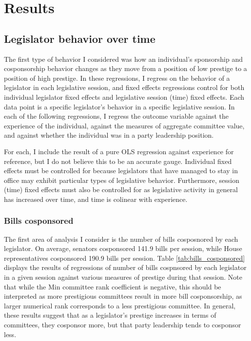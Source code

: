 \documentclass{article}
\begin{document}
\section{Results} 
\subsection{Legislator behavior over time}
The first type of behavior I considered was how an individual's sponsorship and cosponsorship behavior changes as they move from a position of low prestige to a position of high prestige. In these regressions, I regress on the behavior of a legislator in each legislative session, and fixed effects regressions control for both individual legislator fixed effects and legislative session (time) fixed effects. Each data point is a specific legislator's behavior in a specific legislative session. In each of the following regressions, I regress the outcome variable against the experience of the individual, against the measures of aggregate committee value, and against whether the individual was in a party leadership position. 

For each, I include the result of a pure OLS regression against experience for reference, but I do not believe this to be an accurate gauge. Individual fixed effects must be controlled for because legislators that have managed to stay in office may exhibit particular types of legislative behavior. Furthermore, session (time) fixed effects must also be controlled for as legislative activity in general has increased over time, and time is colinear with experience. 

\subsubsection{Bills cosponsored}
\label{result:bills_cosponsored}
The first area of analysis I consider is the number of bills cosposnored by each legislator. On average, senators cosponsored 141.9 bills per session, while House representatives cosponsored 190.9 bills per session. Table \ref{tab:bills_cosponsored} displays the results of regressions of number of bills cospnsored by each legislator in a given session against various measures of prestige during that session. Note that while the Min committee rank coefficient is negative, this should be interpreted as more prestigious committees result in more bill cosponsorship, as larger numerical rank corresponds to a less prestigious committee. In general, these results suggest that as a legislator's prestige increases in terms of committees, they cosponsor more, but that party leadership tends to cosponsor less. 
\end{document}
